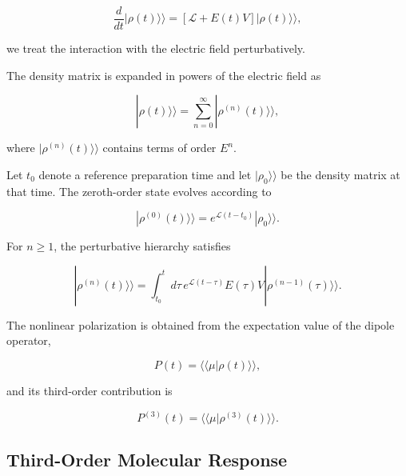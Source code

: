 \documentclass[11pt]{article}
\begin{document}
\begin{equation}
\frac{d}{dt}
|\rho(t)\rangle\rangle
=
\left[
\mathcal{L}
+
E(t)V
\right]
|\rho(t)\rangle\rangle,
\label{eq:driven_master_section3}
\end{equation}

we treat the interaction with the electric field perturbatively.

The density matrix is expanded in powers of the electric field as

\begin{equation}
|\rho(t)\rangle\rangle
=
\sum_{n=0}^{\infty}
|\rho^{(n)}(t)\rangle\rangle,
\end{equation}

where $|\rho^{(n)}(t)\rangle\rangle$ contains terms of order $E^n$.

Let $t_0$ denote a reference preparation time and let
$|\rho_0\rangle\rangle$ be the density matrix at that time. The
zeroth-order state evolves according to

\begin{equation}
|\rho^{(0)}(t)\rangle\rangle
=
e^{\mathcal{L}(t-t_0)}
|\rho_0\rangle\rangle.
\label{eq:zeroth_order_state}
\end{equation}

For $n\geq1$, the perturbative hierarchy satisfies

\begin{equation}
|\rho^{(n)}(t)\rangle\rangle
=
\int_{t_0}^{t}
d\tau\,
e^{\mathcal{L}(t-\tau)}
E(\tau)V
|\rho^{(n-1)}(\tau)\rangle\rangle.
\label{eq:perturbative_recursion}
\end{equation}

The nonlinear polarization is obtained from the expectation value of
the dipole operator,

\begin{equation}
P(t)
=
\langle\!\langle\mu|\rho(t)\rangle\rangle,
\end{equation}

and its third-order contribution is

\begin{equation}
P^{(3)}(t)
=
\langle\!\langle\mu|\rho^{(3)}(t)\rangle\rangle.
\end{equation}


\subsection{Third-Order Molecular Response}
\end{document}
